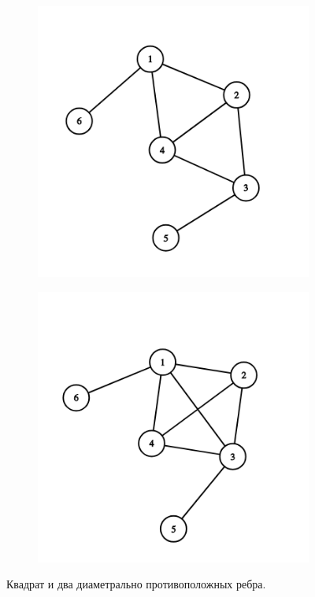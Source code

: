 \begin{solution}
\begin{figure}[H]
\begin{subfigure}[a]{0.24\linewidth}
  \end{subfigure}
  \begin{subfigure}[a]{0.24\linewidth}
    \includegraphics[width=\linewidth]{_img/344/14.png}
  \end{subfigure}
  \begin{subfigure}[a]{0.24\linewidth}
    \includegraphics[width=\linewidth]{_img/344/15.png}
  \end{subfigure}
  \caption{Квадрат и два диаметрально противоположных ребра.}
\end{figure}


\end{solution}
